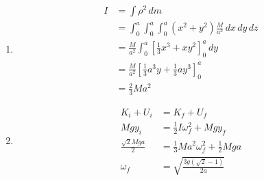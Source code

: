 \documentclass{article}
\begin{document}
\begin{enumerate}
  \item

        \begin{align*}
          I & = \int \rho^2 \,d m                                                       \\
            & = \int_0^a \int_0^a \int_0^a (x^2 + y^2) \frac{M}{a^3} \,d x \,d y \,d z  \\
            & = \frac{M}{a^2} \int_0^a \left[ \frac{1}{3} x^3 + x y^2 \right]_0^a \,d y \\
            & = \frac{M}{a^2} \left[ \frac{1}{3} a^3 y + \frac{1}{3} a y^3 \right]_0^a  \\
            & = \frac{2}{3} M a^2
        \end{align*}

  \item

        \begin{align*}
          K_i + U_i                & = K_f + U_f                                        \\
          M g y_i                  & = \frac{1}{2} I \omega_f^2 + M g y_f               \\
          \frac{\sqrt{2} M g a}{2} & = \frac{1}{3} M a^2 \omega_f^2 + \frac{1}{2} M g a \\
          \omega_f                 & = \sqrt{\frac{3 g (\sqrt{2} - 1)}{2 a}}
        \end{align*}
\end{enumerate}
\end{document}
